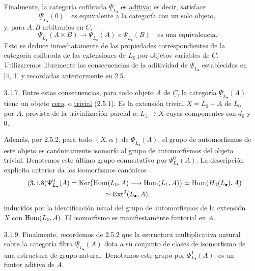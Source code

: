 Finalmente, la categoría cofibrada $\underline\Psi_{L_\bullet}$ es
\underline{aditiva}; es decir, satisface
\begin{equation}\tag{3.1.5}
 \underline\Psi_{L_\bullet}(0)
 \quad\text{es equivalente a la categoría con un solo objeto},
\end{equation}
y, para $A,B$ arbitrarios en $\underline C$,
\begin{equation}\tag{3.1.6}
 \underline\Psi_{L_\bullet}(A\times B)
 \longrightarrow
 \underline\Psi_{L_\bullet}(A)\times
 \underline\Psi_{L_\bullet}(B)
 \quad\text{es una equivalencia}.
\end{equation}
Esto se deduce inmediatamente de las propiedades correspondientes de
la categoría cofibrada de las extensiones de $L_0$ por objetos
variables de $\underline C$. Utilizaremos libremente las consecuencias
de la aditividad de $\underline\Psi_{L_\bullet}$ establecidas en
[4, 1] y recordadas anteriormente en 2.5.

3.1.7. Entre estas consecuencias, para todo objeto $A$ de
$\underline C$, la categoría $\underline\Psi_{L_\bullet}(A)$ tiene un
objeto \underline{cero}, o \underline{trivial} (2.5.1). Es la
extensión trivial $X=L_0+A$ de $L_0$ por $A$, provista de la
trivialización parcial $\alpha:L_1\longrightarrow X$ cuyas componentes
son $d_0$ y $0$.

Además, por 2.5.2, para todo $(X,\alpha)$ de
$\underline\Psi_{L_\bullet}(A)$, el grupo de automorfismos de este
objeto es canónicamente isomorfo al grupo de automorfismos del objeto
trivial. Denotemos este último grupo conmutativo por
$\Psi^0_{L_\bullet}(A)$. La descripción explícita anterior da los
isomorfismos canónicos
\begin{multline}\tag{3.1.8}
 \Psi^0_{L_\bullet}(A)
 =\operatorname{Ker}\bigl(\operatorname{Hom}(L_0,A)\longrightarrow\operatorname{Hom}(L_1,A)\bigr)
 \simeq\operatorname{Hom}(H_0(L_\bullet),A)\\
 \simeq\operatorname{Ext}^0(L_\bullet,A),
\end{multline}
inducidos por la identificación usual del grupo de automorfismos de
la extensión $X$ con $\operatorname{Hom}(L_0,A)$. El isomorfismo
 es manifiestamente funtorial en $A$.

3.1.9. Finalmente, recordemos de 2.5.2 que la estructura
multiplicativa natural sobre la categoría fibra
$\underline\Psi_{L_\bullet}(A)$ dota a su conjunto de clases de
isomorfismo de una estructura de grupo natural. Denotamos este grupo
por $\Psi^1_{L_\bullet}(A)$; es un funtor aditivo de $A$.

